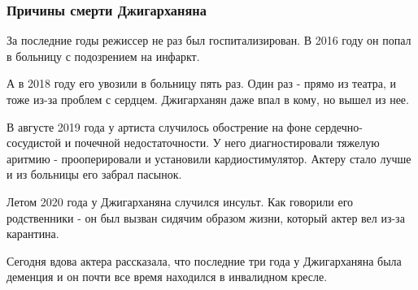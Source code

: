  
 
 

\subsubsection{Причины смерти Джигарханяна}
\label{sec:14_11_2020.news.ua.strana.1.deaths.armen_dzhiharnajan.prichiny_smerti}

За последние годы режиссер не раз был госпитализирован. В 2016 году он
попал в больницу с подозрением на инфаркт.

А в 2018 году его увозили в больницу пять раз. Один раз - прямо из театра,
и тоже из-за проблем с сердцем. Джигарханян даже впал в кому, но вышел из
нее.

В августе 2019 года у артиста случилось обострение на фоне
сердечно-сосудистой и почечной недостаточности. У него диагностировали
тяжелую аритмию - прооперировали и установили кардиостимулятор. Актеру
стало лучше и из больницы его забрал пасынок.

Летом 2020 года у Джигарханяна случился инсульт. Как говорили его
родственники - он был вызван сидячим образом жизни, который актер вел
из-за карантина. 

Сегодня вдова актера рассказала, что последние три года у Джигарханяна
была деменция и он почти все время находился в инвалидном кресле. 

